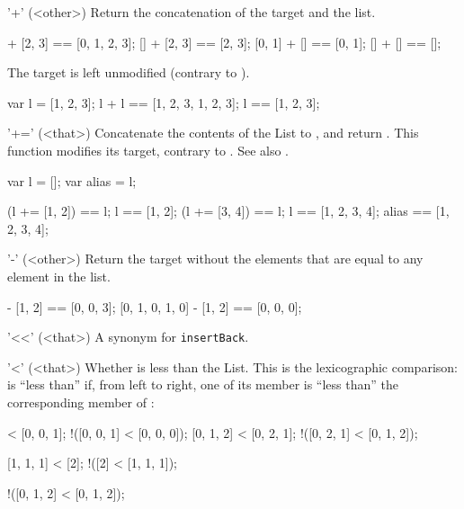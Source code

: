 \begin{urbiscriptapi}
\item['+'](<other>)%
  Return the concatenation of the target and the  list.

\begin{urbiassert}
[0, 1] + [2, 3] == [0, 1, 2, 3];
    [] + [2, 3] == [2, 3];
[0, 1] + []     == [0, 1];
    [] + []     == [];
\end{urbiassert}

The target is left unmodified (contrary to ).
\begin{urbiassert}
var l = [1, 2, 3];
l + l == [1, 2, 3, 1, 2, 3];
l     == [1, 2, 3];
\end{urbiassert}

\item['+='](<that>)%
  Concatenate the contents of the List  to \this, and return
  \this.  This function modifies its target, contrary to .  See
  also .

\begin{urbiassert}
var l = [];
var alias = l;

(l += [1, 2]) == l;
l == [1, 2];
(l += [3, 4]) == l;
l == [1, 2, 3, 4];
alias == [1, 2, 3, 4];
\end{urbiassert}

\item['-'](<other>)%
  Return the target without the elements that are equal to any element
  in the  list.

\begin{urbiassert}
[0, 1, 0, 2, 3] - [1, 2] == [0, 0, 3];
[0, 1, 0, 1, 0] - [1, 2] == [0, 0, 0];
\end{urbiassert}

\item['<<'](<that>)%
  A synonym for \lstinline|insertBack|.

\item['<'](<that>)%
  Whether \this is less than the \that List.  This is the lexicographic
  comparison: \this is ``less than'' \that if, from left to right, one of
  its member is ``less than'' the corresponding member of \that:

\begin{urbiassert}
  [0, 0, 0] < [0, 0, 1];    !([0, 0, 1] < [0, 0, 0]);
  [0, 1, 2] < [0, 2, 1];    !([0, 2, 1] < [0, 1, 2]);

  [1, 1, 1] < [2];          !([2] < [1, 1, 1]);

 !([0, 1, 2] < [0, 1, 2]);
\end{urbiassert}


\end{urbiscriptapi}
